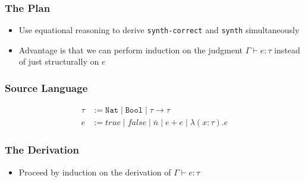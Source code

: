 \documentclass[usenames,dvipsnames]{beamer}
\newcommand{\Nat}{\texttt{Nat}}
\begin{document}

\begin{frame}
  \frametitle{The Plan}

  \begin{itemize}
    \item Use equational reasoning to derive \texttt{synth-correct} and
      \texttt{synth} simultaneously

    \item Advantage is that we can perform induction on the judgment $\Gamma
      \vdash e : \tau$ instead of just structurally on $e$
  \end{itemize}
\end{frame}


\begin{frame}
  \frametitle{Source Language}

  \begin{align*}
    \tau &:= \Nat \mid \texttt{Bool} \mid \tau \rightarrow \tau \\
    e &:= true \mid false \mid \overline{n} \mid e + e \mid \lambda (x:\tau).e
  \end{align*}
\end{frame}


\begin{frame}
  \frametitle{The Derivation}

  \begin{itemize}
    \item Proceed by induction on the derivation of $\Gamma \vdash e : \tau$
  \end{itemize}
\end{frame}

\end{document}
